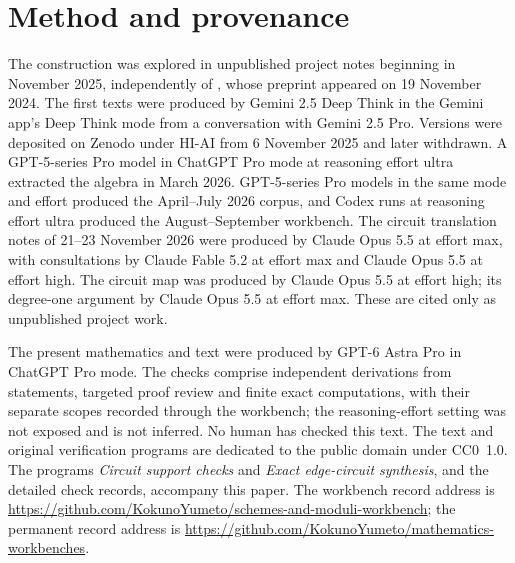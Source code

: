 \documentclass[11pt]{article}
\newcommand{\workbenchurl}{https://github.com/KokunoYumeto/schemes-and-moduli-workbench}
\newcommand{\recordurl}{https://github.com/KokunoYumeto/mathematics-workbenches}
\theoremstyle{definition}
\theoremstyle{remark}
\begin{document}
\section*{Method and provenance}
The construction was explored in unpublished project notes beginning in November 2025, independently of \citet{FGJM}, whose preprint appeared on 19 November 2024. The first texts were produced by Gemini 2.5 Deep Think in the Gemini app's Deep Think mode from a conversation with Gemini 2.5 Pro. Versions were deposited on Zenodo under HI-AI from 6 November 2025 and later withdrawn. A GPT-5-series Pro model in ChatGPT Pro mode at reasoning effort ultra extracted the algebra in March 2026. GPT-5-series Pro models in the same mode and effort produced the April--July 2026 corpus, and Codex runs at reasoning effort ultra produced the August--September workbench. The circuit translation notes of 21--23 November 2026 were produced by Claude Opus 5.5 at effort max, with consultations by Claude Fable 5.2 at effort max and Claude Opus 5.5 at effort high. The circuit map was produced by Claude Opus 5.5 at effort high; its degree-one argument by Claude Opus 5.5 at effort max. These are cited only as unpublished project work.

The present mathematics and text were produced by GPT-6 Astra Pro in ChatGPT Pro mode. The checks comprise independent derivations from statements, targeted proof review and finite exact computations, with their separate scopes recorded through the workbench; the reasoning-effort setting was not exposed and is not inferred. No human has checked this text. The text and original verification programs are dedicated to the public domain under CC0~1.0. The programs \emph{Circuit support checks} and \emph{Exact edge-circuit synthesis}, and the detailed check records, accompany this paper. The workbench record address is \url{\workbenchurl}; the permanent record address is \url{\recordurl}.
\end{document}
